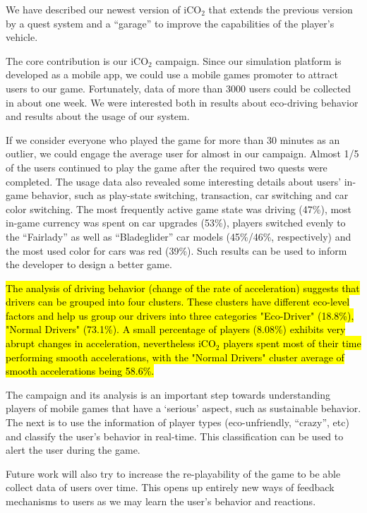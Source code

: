 \documentclass[preprint,authoryear,12pt]{elsarticle}
\newcommand{\hlc}[2][yellow]{ {\sethlcolor{#1} \hl{#2}} }
\begin{document}
We have described our newest version of iCO$_2$ that extends the previous version \citep{prendingeroliveira2014} by a quest system and a ``garage'' to improve the capabilities of the player's vehicle.

The core contribution is our iCO$_2$ campaign. Since our simulation platform is developed as a mobile app, we could use a mobile games promoter to attract users to our game. Fortunately, data of more than 3000 users could be collected in about one week. We were interested both in results about eco-driving behavior and results about the usage of our system.

If we consider everyone who played the game for more than 30 minutes as an outlier, we could engage the average user for almost in our campaign. Almost 1/5 of the users continued to play the game after the required two quests were completed.
The usage data also revealed some interesting details about users' in-game behavior, such as play-state switching, transaction, car switching and car color switching.
The most frequently active game state was driving (47\%), most in-game currency was spent on car upgrades (53\%), players switched evenly to the ``Fairlady'' as well as ``Bladeglider'' car models (45\%/46\%, respectively) and the most used color for cars was red (39\%). Such results can be used to inform the developer to design a better game.

\hlc[green]{
The analysis of driving behavior (change of the rate of acceleration) suggests that drivers can be grouped into four clusters. These clusters have different eco-level factors and help us group our drivers into three categories "Eco-Driver" (18.8\%), "Normal Drivers" (73.1\%). A small percentage of players (8.08\%) exhibits very abrupt changes in acceleration, nevertheless iCO$_2$ players spent most of their time performing smooth accelerations, with the "Normal Drivers" cluster average of smooth accelerations being 58.6\%.
}

The campaign and its analysis is an important step towards understanding players of mobile games that have a `serious' aspect, such as sustainable behavior. The next is to use the information of player types (eco-unfriendly, ``crazy'', etc) and classify the user's behavior in real-time. This classification can be used to alert the user during the game.

Future work will also try to increase the re-playability of the game to be able collect data of users over time. This opens up entirely new ways of feedback mechanisms to users as we may learn the user's behavior and reactions.
\end{document}
